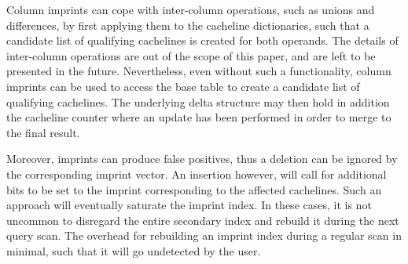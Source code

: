 Column imprints can cope with inter-column operations, such as unions and
differences, by first applying them to the cacheline dictionaries, such that a
candidate list of qualifying cachelines is created for both operands. The
details of inter-column operations are out of the scope of this paper, and are
left to be presented in the future. Nevertheless, even without such a
functionality, column imprints can be used to access the base table to create
a candidate list of qualifying cachelines. The underlying delta structure may
then hold in addition the cacheline counter where an update has been performed
in order to merge to the final result.

Moreover, imprints can produce false positives, thus a deletion can be ignored
by the corresponding imprint vector. An insertion however, will call for
additional bits to be set to the imprint corresponding to the affected
cachelines. Such an approach will eventually saturate the imprint index. In
these cases, it is not uncommon to disregard the entire secondary index and
rebuild it during the next query scan. The overhead for rebuilding an imprint
index during a regular scan in minimal, such that it will go undetected by the
user.
